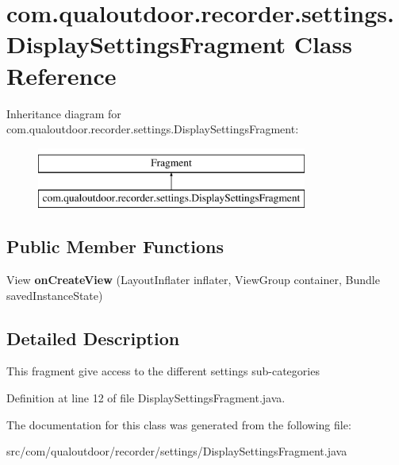 \hypertarget{classcom_1_1qualoutdoor_1_1recorder_1_1settings_1_1DisplaySettingsFragment}{\section{com.\-qualoutdoor.\-recorder.\-settings.\-Display\-Settings\-Fragment Class Reference}
\label{classcom_1_1qualoutdoor_1_1recorder_1_1settings_1_1DisplaySettingsFragment}
}
Inheritance diagram for com.\-qualoutdoor.\-recorder.\-settings.\-Display\-Settings\-Fragment\-:\begin{figure}[H]
\begin{center}
\leavevmode
\includegraphics[height=2.000000cm]{classcom_1_1qualoutdoor_1_1recorder_1_1settings_1_1DisplaySettingsFragment}
\end{center}
\end{figure}
\subsection*{Public Member Functions}
\begin{DoxyCompactItemize}
\item 
\hypertarget{classcom_1_1qualoutdoor_1_1recorder_1_1settings_1_1DisplaySettingsFragment_aa4ba98386d247cdf2ff30da92bef8b39}{View {\bfseries on\-Create\-View} (Layout\-Inflater inflater, View\-Group container, Bundle saved\-Instance\-State)}\label{classcom_1_1qualoutdoor_1_1recorder_1_1settings_1_1DisplaySettingsFragment_aa4ba98386d247cdf2ff30da92bef8b39}

\end{DoxyCompactItemize}


\subsection{Detailed Description}
This fragment give access to the different settings sub-\/categories 

Definition at line 12 of file Display\-Settings\-Fragment.\-java.



The documentation for this class was generated from the following file\-:\begin{DoxyCompactItemize}
\item 
src/com/qualoutdoor/recorder/settings/Display\-Settings\-Fragment.\-java\end{DoxyCompactItemize}
